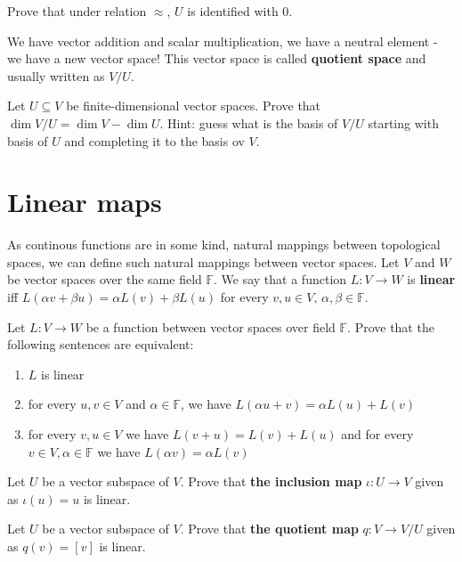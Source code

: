 \begin{prob}
  Prove that under relation $\approx$, $U$ is identified with 0.
\end{prob}

We have vector addition and scalar multiplication, we have a neutral element - we have a new vector space! This vector space is called \textbf{quotient space} and usually written as
$V/U$.

\begin{prob}
  Let $U\subseteq V$ be finite-dimensional vector spaces. Prove that $\dim V/U=\dim V - \dim U$. Hint: guess what is the basis of $V/U$ starting with basis of $U$ and completing
  it to the basis ov $V$.
\end{prob}

\section{Linear maps}
As continous functions are in some kind, natural mappings between topological spaces, we can define such natural mappings between vector spaces. Let $V$ and $W$ be vector spaces over
the same field $\mathbb F$. We say that a function $L:V\to W$ is \textbf{linear} iff $L(\alpha v + \beta u)=\alpha L(v) + \beta L(u)$ for every $v,u\in V,\, \alpha,\beta\in \mathbb F$.

\begin{prob}
  Let $L:V\to W$ be a function between vector spaces over field $\mathbb F$. Prove that the following sentences are equivalent:
  \begin{enumerate}
    \item $L$ is linear
    \item for every $u,v\in V$ and $\alpha\in \mathbb F$, we have $L(\alpha u+v)=\alpha L(u)+L(v)$
    \item for every $v,u\in V$ we have $L(v+u)=L(v)+L(u)$ and for every $v\in V, \alpha\in \mathbb F$ we have $L(\alpha v) = \alpha L(v)$
  \end{enumerate}
\end{prob}

\begin{prob}
  Let $U$ be a vector subspace of $V$. Prove that \textbf{the inclusion map} $\iota : U\to V$ given as $\iota(u)=u$ is linear.
\end{prob}

\begin{prob}
  Let $U$ be a vector subspace of $V$. Prove that \textbf{the quotient map} $q: V\to V/U$ given as $q(v)=[v]$ is linear.
\end{prob}

